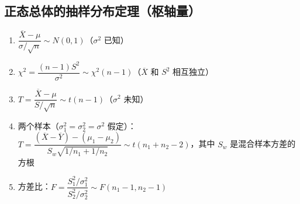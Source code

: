 \subsection{正态总体的抽样分布定理（枢轴量）}
\begin{property}
\begin{enumerate}
	\item $\dfrac{\overline{X} - \mu}{\sigma/\sqrt{n}} \sim N(0, 1)$（$\sigma^2$ 已知）
	\item $\chi^2 = \dfrac{(n-1)S^2}{\sigma^2} \sim \chi^2(n-1)$（$\overline{X}$ 和 $S^2$ 相互独立）
	\item $T = \dfrac{\overline{X} - \mu}{S/\sqrt{n}} \sim t(n-1)$（$\sigma^2$ 未知）
	\item 两个样本（$\sigma_1^2 = \sigma_2^2 = \sigma^2$ 假定）：$T = \dfrac{(\overline{X}-\overline{Y}) - (\mu_1 - \mu_2)}{S_w \sqrt{1/n_1 + 1/n_2}} \sim t(n_1+n_2-2)$，其中 $S_w$ 是混合样本方差的方根
	\item 方差比：$F = \dfrac{S_1^2/\sigma_1^2}{S_2^2/\sigma_2^2} \sim F(n_1-1, n_2-1)$
\end{enumerate}
\end{property}

